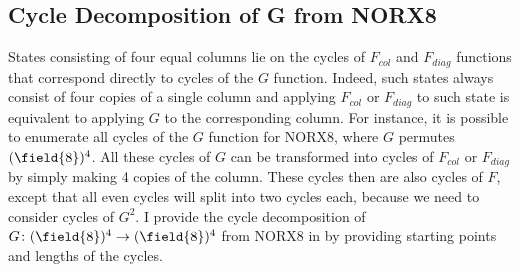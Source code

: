 \subsection{Cycle Decomposition of G from NORX8}

States consisting of four equal columns lie on the cycles of $F_{col}$ and $F_{diag}$ functions that correspond directly to cycles of the $G$ function. Indeed, such states always consist of four copies of a single column and applying $F_{col}$ or $F_{diag}$ to such state is equivalent to applying $G$ to the corresponding column. For instance, it is possible to enumerate all cycles of the $G$ function for NORX8, where $G$ permutes $(\field{8})^4$. All these cycles of $G$ can be transformed into cycles of $F_{col}$ or $F_{diag}$ by simply making 4 copies of the column. These cycles then are also cycles of $F$, except that all even cycles will split into two cycles each, because we need to consider cycles of $G^2$. I provide the cycle decomposition of $G\colon (\field{8})^4 \to (\field{8})^4$ from NORX8 in  by providing starting points and lengths of the cycles.

